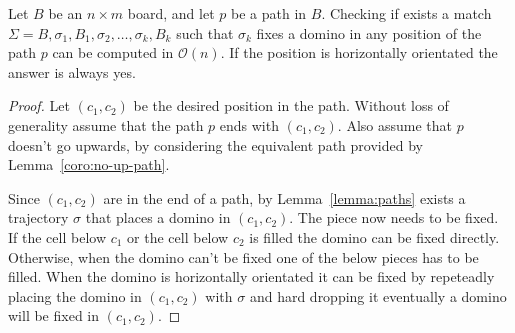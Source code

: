 \begin{lemma} \label{lemma:can-fix}
 Let $B$ be an $n\times m $ board, and let $p$ be a path in $B$. Checking if exists a match $\Sigma = B,\sigma_1, B_1, \sigma_2, \dots, \sigma_k, B_k$ such that $\sigma_k$ fixes a domino in any position of the path $p$ can be computed in $\mathcal{O}(n)$. If the position is horizontally orientated the answer is always yes.
\end{lemma}
\begin{proof} 
  Let $(c_1, c_2)$ be the desired position in the path. Without loss of generality assume that the path $p$ ends with $(c_1, c_2)$.  Also assume that $p$ doesn't go upwards, by considering the equivalent path provided by Lemma~\ref{coro:no-up-path}.

  Since $(c_1, c_2)$ are in the end of a path, by Lemma~\ref{lemma:paths} exists a trajectory $\sigma$ that places a domino in $(c_1, c_2)$. The piece now needs to be fixed. If the cell below $c_1$ or the cell below $c_2$ is filled the domino can be fixed directly. Otherwise, when the domino can't be fixed one of the below pieces has to be filled. When the domino is horizontally orientated it can be fixed by repeteadly placing the domino in $(c_1, c_2)$ with $\sigma$ and hard dropping it eventually a domino will be fixed in $(c_1, c_2)$.


\end{proof}
